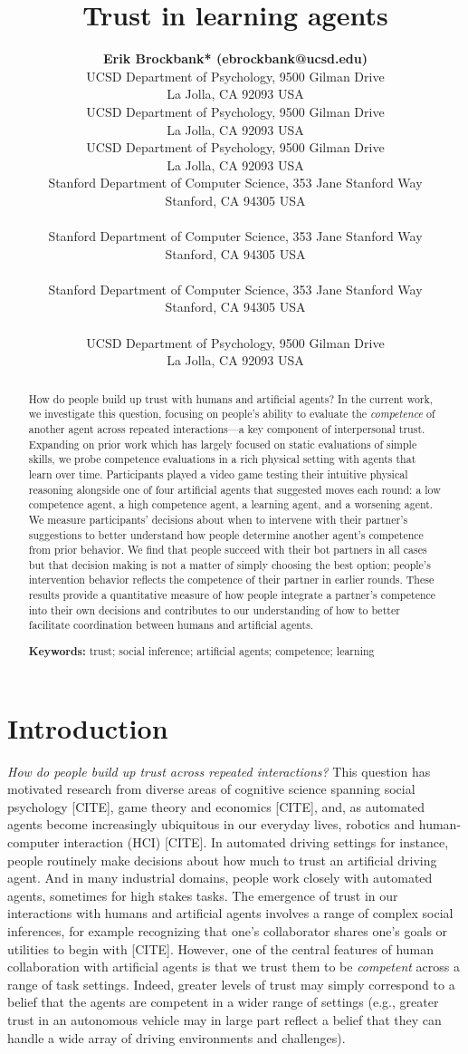 \documentclass[10pt,letterpaper]{article}
\title{Trust in learning agents}
\author{
  {
  \large \bf Erik Brockbank* (ebrockbank@ucsd.edu)} \\
  UCSD Department of Psychology, 9500 Gilman Drive \\
  La Jolla, CA 92093 USA
  \AND {\large \bf Haoliang Wang* (haw027@ucsd.edu)} \\
  UCSD Department of Psychology, 9500 Gilman Drive \\
  La Jolla, CA 92093 USA
  \AND {\large \bf Justin Yang (juy003@ucsd.edu)} \\
  UCSD Department of Psychology, 9500 Gilman Drive \\
  La Jolla, CA 92093 USA
  \AND {\large \bf Suvir Mirchandani (suvir@cs.stanford.edu)} \\
  Stanford Department of Computer Science, 353 Jane Stanford Way \\
  Stanford, CA 94305 USA \\
  \AND {\large \bf Erdem Biyik (ebiyik@stanford.edu)} \\
  Stanford Department of Computer Science, 353 Jane Stanford Way \\
  Stanford, CA 94305 USA \\
  \AND {\large \bf Dorsa Sadigh (dorsa@cs.stanford.edu)} \\
  Stanford Department of Computer Science, 353 Jane Stanford Way \\
  Stanford, CA 94305 USA \\
  \AND {\large \bf Judith Fan (jefan@ucsd.edu)} \\
  UCSD Department of Psychology, 9500 Gilman Drive \\
  La Jolla, CA 92093 USA \\
}
\begin{document}
\maketitle


\begin{abstract}
How do people build up trust with humans and artificial agents? In the current work, we investigate this question, focusing on people's ability to evaluate the \textit{competence} of another agent across repeated interactions---a key component of interpersonal trust. Expanding on prior work which has largely focused on static evaluations of simple skills, we probe competence evaluations in a rich physical setting with agents that learn over time. Participants played a video game testing their intuitive physical reasoning alongside one of four artificial agents that suggested moves each round: a low competence agent, a high competence agent, a learning agent, and a worsening agent. We measure participants' decisions about when to intervene with their partner's suggestions to better understand how people determine another agent's competence from prior behavior. We find that people succeed with their bot partners in all cases but that decision making is not a matter of simply choosing the best option; people's intervention behavior reflects the competence of their partner in earlier rounds. These results provide a quantitative measure of how people integrate a partner's competence into their own decisions and contributes to our understanding of how to better facilitate coordination between humans and artificial agents.

\textbf{Keywords:} 
trust; social inference; artificial agents; competence; learning 
\end{abstract}


\section{Introduction}

\textit{How do people build up trust across repeated interactions?} This question has motivated research from diverse areas of cognitive science spanning social psychology [CITE], game theory and economics [CITE], and, as automated agents become increasingly ubiquitous in our everyday lives, robotics and human-computer interaction (HCI) [CITE]. 
In automated driving settings for instance, people routinely make decisions about how much to trust an artificial driving agent. And in many industrial domains, people work closely with automated agents, sometimes for high stakes tasks. The emergence of trust in our interactions with humans and artificial agents involves a range of complex social inferences, for example recognizing that one's collaborator shares one's goals or utilities to begin with [CITE]. However, one of the central features of human collaboration with artificial agents is that we trust them to be \textit{competent} across a range of task settings. Indeed, greater levels of trust may simply correspond to a belief that the agents are competent in a wider range of settings (e.g., greater trust in an autonomous vehicle may in large part reflect a belief that they can handle a wide array of driving environments and challenges).
\end{document}
